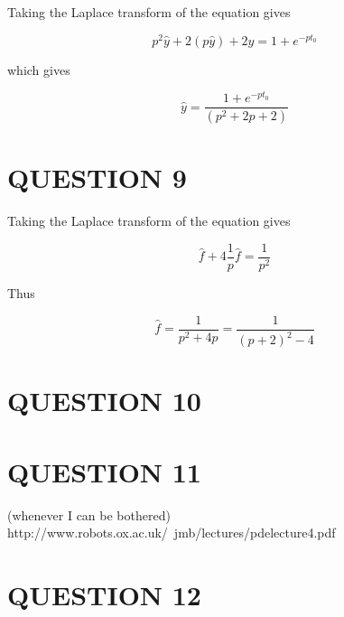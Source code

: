 \documentclass[a4paper]{article}
\begin{document}
Taking the Laplace transform of the equation gives

\[ p^{2} \hat{y} + 2 (p \hat{y}) + 2 \hat{y} = 1 + e^{-pt_{0}} \]

which gives

\[ \hat{y} = \frac{1 + e^{-pt_{0}}}{(p^{2} + 2p + 2)} \]





\section{QUESTION 9}

Taking the Laplace transform of the equation gives

\[ \hat{f} + 4 \frac{1}{p} \hat{f} = \frac{1}{p^{2}} \]

Thus

\[ \hat{f} = \frac{1}{p^{2} + 4p} = \frac{1}{(p+2)^{2} -4} \]


\section{QUESTION 10}
\section{QUESTION 11}

(whenever I can be bothered) http://www.robots.ox.ac.uk/~jmb/lectures/pdelecture4.pdf


\section{QUESTION 12}
\end{document}
